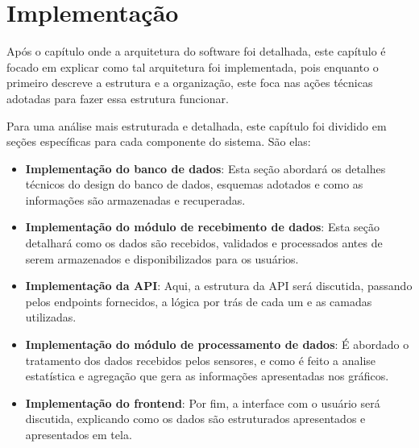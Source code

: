 \chapter{Implementação}\label{cap:implementation}



Após o capítulo onde a arquitetura do software foi detalhada, este capítulo é focado em explicar como tal arquitetura foi implementada, pois enquanto o primeiro descreve a estrutura e a organização, este foca nas ações técnicas adotadas para fazer essa estrutura funcionar.

Para uma análise mais estruturada e detalhada, este capítulo foi dividido em seções específicas para cada componente do sistema. São elas:

\begin{itemize}
    \item \textbf{Implementação do banco de dados}: Esta seção abordará os detalhes técnicos do design do banco de dados, esquemas adotados e como as informações são armazenadas e recuperadas.
    
    \item \textbf{Implementação do módulo de recebimento de dados}: Esta seção detalhará como os dados são recebidos, validados e processados antes de serem armazenados e disponibilizados para os usuários.
    
    \item \textbf{Implementação da API}: Aqui, a estrutura da \gls{API} será discutida, passando pelos endpoints fornecidos, a lógica por trás de cada um e as camadas utilizadas.
    
    \item \textbf{Implementação do módulo de processamento de dados}: É abordado o tratamento dos dados recebidos pelos sensores, e como é feito a analise estatística e agregação que gera as informações apresentadas nos gráficos.
    
    \item \textbf{Implementação do frontend}: Por fim, a interface com o usuário será discutida, explicando como os dados são estruturados apresentados e apresentados em tela.
\end{itemize}







